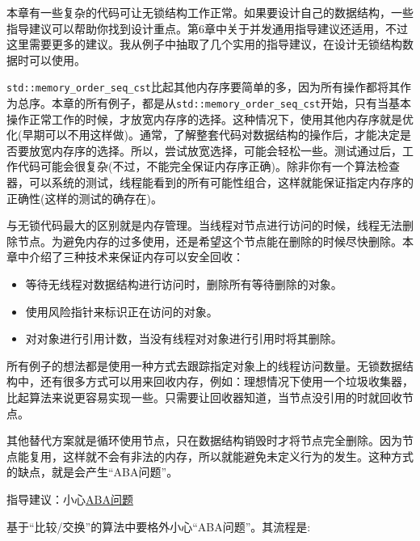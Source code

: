 
本章有一些复杂的代码可让无锁结构工作正常。如果要设计自己的数据结构，一些指导建议可以帮助你找到设计重点。第6章中关于并发通用指导建议还适用，不过这里需要更多的建议。我从例子中抽取了几个实用的指导建议，在设计无锁结构数据时可以使用。


\texttt{std::memory\_order\_seq\_cst}比起其他内存序要简单的多，因为所有操作都将其作为总序。本章的所有例子，都是从\texttt{std::memory\_order\_seq\_cst}开始，只有当基本操作正常工作的时候，才放宽内存序的选择。这种情况下，使用其他内存序就是优化(早期可以不用这样做)。通常，了解整套代码对数据结构的操作后，才能决定是否要放宽内存序的选择。所以，尝试放宽选择，可能会轻松一些。测试通过后，工作代码可能会很复杂(不过，不能完全保证内存序正确)。除非你有一个算法检查器，可以系统的测试，线程能看到的所有可能性组合，这样就能保证指定内存序的正确性(这样的测试的确存在)。


与无锁代码最大的区别就是内存管理。当线程对节点进行访问的时候，线程无法删除节点。为避免内存的过多使用，还是希望这个节点能在删除的时候尽快删除。本章中介绍了三种技术来保证内存可以安全回收：

\begin{itemize}
    \item 等待无线程对数据结构进行访问时，删除所有等待删除的对象。
    \item 使用风险指针来标识正在访问的对象。
    \item 对对象进行引用计数，当没有线程对对象进行引用时将其删除。
\end{itemize}

所有例子的想法都是使用一种方式去跟踪指定对象上的线程访问数量。无锁数据结构中，还有很多方式可以用来回收内存，例如：理想情况下使用一个垃圾收集器，比起算法来说更容易实现一些。只需要让回收器知道，当节点没引用的时就回收节点。

其他替代方案就是循环使用节点，只在数据结构销毁时才将节点完全删除。因为节点能复用，这样就不会有非法的内存，所以就能避免未定义行为的发生。这种方式的缺点，就是会产生“ABA问题”。

 {指导建议：小心\href{https://en.wikipedia.org/wiki/ABA_problem}{ABA问题}}

基于“比较/交换”的算法中要格外小心“ABA问题”。其流程是:

